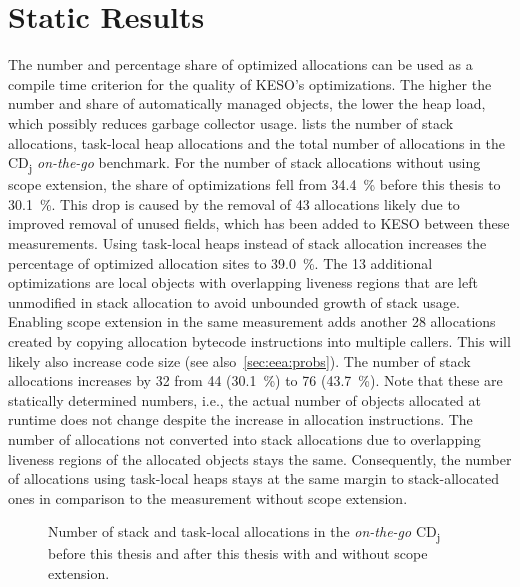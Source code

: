 	\section{Static Results}
		\label{sec:eval:static}
		The number and percentage share of optimized allocations can be used as a compile time criterion for the quality of
		KESO's optimizations. The higher the number and share of automatically managed objects, the lower the heap load,
		which possibly reduces garbage collector usage.  lists the number of stack
		allocations, task-local heap allocations and the total number of allocations in the CD\textsubscript{j}
		\emph{on-the-go} benchmark. For the number of stack allocations without using scope extension, the share of
		optimizations fell from 34.4~\% before this thesis to 30.1~\%. This drop is caused by the removal of 43 allocations
		likely due to improved removal of unused fields, which has been added to KESO between these measurements. Using
		task-local heaps instead of stack allocation increases the percentage of optimized allocation sites to 39.0~\%. The
		13 additional optimizations are local objects with overlapping liveness regions that are left unmodified in stack
		allocation to avoid unbounded growth of stack usage. Enabling scope extension in the same measurement adds another
		28 allocations created by copying allocation bytecode instructions into multiple callers. This will likely also
		increase code size (see also~\cref{sec:eea:probs}). The number of stack allocations increases by 32 from 44
		(30.1~\%) to 76 (43.7~\%). Note that these are statically determined numbers, i.e., the actual number of objects
		allocated at runtime does not change despite the increase in allocation instructions. The number of allocations not
		converted into stack allocations due to overlapping liveness regions of the allocated objects stays the same.
		Consequently, the number of allocations using task-local heaps stays at the same margin to stack-allocated ones in
		comparison to the measurement without scope extension.

		\begin{figure}
			\centering
			

			\caption{%
				Number of stack and task-local allocations in the \emph{on-the-go} CD\textsubscript{j} before this thesis and
				after this thesis with and without scope extension.}
			\label{fig:eval:static:numallocs}
		\end{figure}

